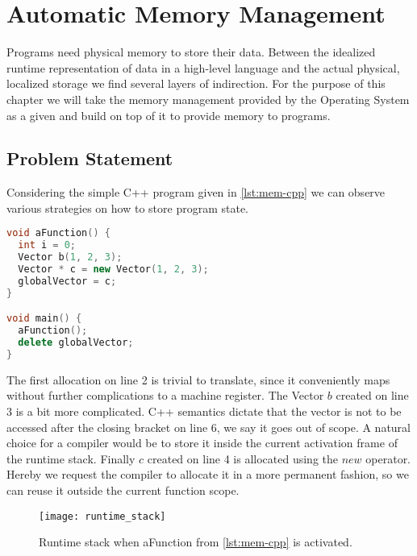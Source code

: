 \chapter{Automatic Memory Management}

Programs need physical memory to store their data. Between the idealized runtime representation of data in a high-level language and the actual physical, localized storage we find several layers of indirection. For the purpose of this chapter we will take the memory management provided by the Operating System as a given and build on top of it to provide memory to \rift programs.

\section{Problem Statement}

Considering the simple C++ program given in \autoref{lst:mem-cpp} we can observe various strategies on how to store program state.

\begin{lstlisting}[language=cpp, caption={Memory in C++}, label={lst:mem-cpp}]
void aFunction() {
  int i = 0;
  Vector b(1, 2, 3);
  Vector * c = new Vector(1, 2, 3);
  globalVector = c;
}

void main() {
  aFunction();
  delete globalVector;
}
\end{lstlisting}

The first allocation on line 2 is trivial to translate, since it conveniently maps without further complications to a machine register. The Vector $b$ created on line 3 is a bit more complicated. C++ semantics dictate that the vector is not to be accessed after the closing bracket on line 6, \ie we say it goes out of scope. A natural choice for a compiler would be to store it inside the current activation frame of the runtime stack. Finally $c$ created on line 4 is allocated using the $new$ operator. Hereby we request the compiler to allocate it in a more permanent fashion, so we can reuse it outside the current function scope.

\begin{figure}[h]
\centering
\texttt{[image: runtime\_stack]}
\caption{Runtime stack when aFunction from \autoref{lst:mem-cpp} is activated.}
\label{fig:runtime-stack}
\end{figure}

